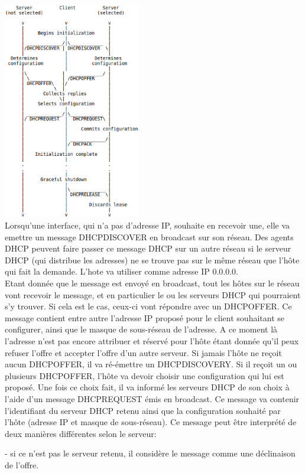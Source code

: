 \documentclass[twoside,openright,a4paper,11pt,french]{article}
\begin{document}
\includegraphics[width=6cm]{./pics/timeline_dhcp.eps}
\\
Lorsqu'une interface, qui n'a pas d'adresse IP, souhaite en recevoir une, elle va emettre un message DHCPDISCOVER en broadcast sur son réseau. Des agents DHCP peuvent faire passer ce message DHCP sur un autre réseau si le serveur DHCP (qui distribue les adresses) ne se trouve pas sur le même réseau que l'hôte qui fait la demande. L'hote va utiliser comme adresse IP 0.0.0.0.
\\Etant donnée que le message est envoyé en broadcast, tout les hôtes sur le réseau vont recevoir le message, et en particulier le ou les serveurs DHCP qui pourraient s'y trouver. Si cela est le cas, ceux-ci vont répondre avec un DHCPOFFER. Ce message contient entre autre l'adresse IP proposé pour le client souhaitant se configurer, ainsi que le masque de sous-réseau de l'adresse. A ce moment là l'adresse n'est pas encore attribuer et réservé pour l'hôte étant donnée qu'il peux refuser l'offre et accepter l'offre d'un autre serveur. Si jamais l'hôte ne reçoit aucun DHCPOFFER, il va ré-émettre un DHCPDISCOVERY. Si il reçoit un ou plusieurs DHCPOFFER, l'hôte va devoir choisir une configuration qui lui est proposé. Une fois ce choix fait, il va informé les serveurs DHCP de son choix à l'aide d'un message DHCPREQUEST émis en broadcast. Ce message va contenir l'identifiant du serveur DHCP retenu ainsi que la configuration souhaité par l'hôte (adresse IP et masque de sous-réseau). Ce message peut être interprété de deux manières différentes selon le serveur:
\item- si ce n'est pas le serveur retenu, il considère le message comme une déclinaison de l'offre.
\end{document}
